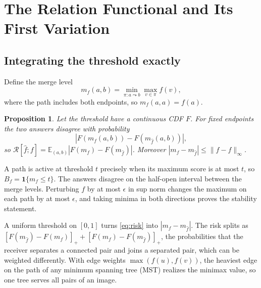 \documentclass[10pt,conference]{IEEEtran}
\newtheorem{proposition}{Proposition}
\newcommand{\E}{\mathbb E}
\begin{document}
\section{The Relation Functional and Its First Variation}
\subsection{Integrating the threshold exactly}
Define the merge level
\begin{equation}
 m_f(a,b)=\min_{\pi:a\leadsto b}\max_{v\in\pi} f(v),
\end{equation}
where the path includes both endpoints, so $m_f(a,a)=f(a)$.
\begin{proposition}\label{prop:risk}
Let the threshold have a continuous CDF $F$. For fixed endpoints the two answers disagree with probability
\begin{equation}
 |F(m_f(a,b))-F(m_{\hat f}(a,b))|, \label{eq:risk}
\end{equation}
so $\mathcal R[\hat f;f]=\E_{(a,b)}|F(m_f)-F(m_{\hat f})|$. Moreover $|m_f-m_{\hat f}|\le\|f-\hat f\|_\infty$.
\end{proposition}
\begin{IEEEproof}
A path is active at threshold $t$ precisely when its maximum score is at most $t$, so $B_f=\mathbf 1\{m_f\le t\}$. The answers disagree on the half-open interval between the merge levels. Perturbing $f$ by at most $\epsilon$ in sup norm changes the maximum on each path by at most $\epsilon$, and taking minima in both directions proves the stability statement.
\end{IEEEproof}
A uniform threshold on $[0,1]$ turns \eqref{eq:risk} into $|m_f-m_{\hat f}|$. The risk splits as $[F(m_{\hat f})-F(m_f)]_++[F(m_f)-F(m_{\hat f})]_+$, the probabilities that the receiver separates a connected pair and joins a separated pair, which can be weighted differently. With edge weights $\max(f(u),f(v))$, the heaviest edge on the path of any minimum spanning tree (MST) realizes the minimax value, so one tree serves all pairs of an image.
\end{document}
